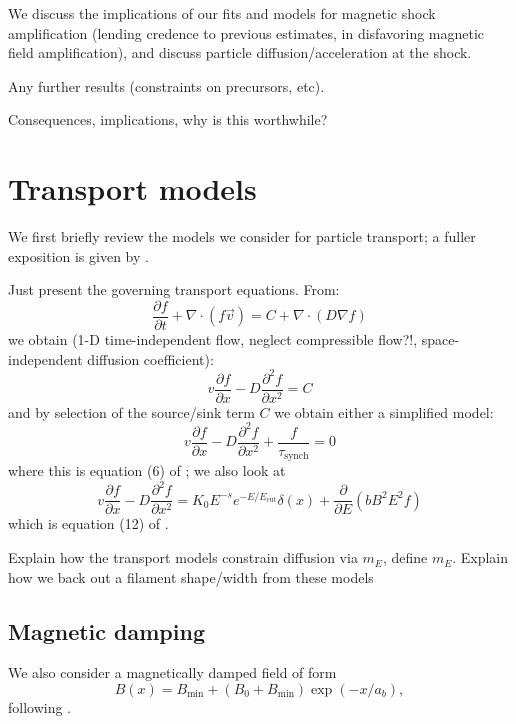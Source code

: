 \documentclass[iop, apj, numberedappendix, twocolappendix]{emulateapj}
\newcommand{\mt}{\mathrm}
\newcommand{\ptl}{\partial}
\newcommand{\del}{\nabla}
\begin{document}
We discuss the implications of our fits and models for magnetic shock
amplification (lending credence to previous estimates, in disfavoring magnetic
field amplification), and discuss particle diffusion/acceleration at the shock.

Any further results (constraints on precursors, etc).

Consequences, implications, why is this worthwhile?

\section{Transport models}

We first briefly review the models we consider for particle transport; a fuller
exposition is given by .

Just present the governing transport equations.  From:
\[
  \frac{\ptl f}{\ptl t} + \del \cdot \left( f \vec{v} \right)
  = C + \del \cdot \left( D \del f \right)
\]
we obtain (1-D time-independent flow, neglect compressible flow?!,
space-independent diffusion coefficient):
\[
    v \frac{\ptl f}{\ptl x} - D \frac{\ptl^2 f}{\ptl x^2} = C
\]
and by selection of the source/sink term $C$ we obtain either a
simplified model:
\begin{equation} \label{eq:simp-mod}
    v \frac{\ptl f}{\ptl x} - D \frac{\ptl^2 f}{\ptl x^2} +
    \frac{f}{\tau_{\mt{synch}}} = 0
\end{equation}
where this is equation (6) of ; we also look at
\begin{equation} \label{eq:full-mod}
    v \frac{\ptl f}{\ptl x} - D \frac{\ptl^2 f}{\ptl x^2} =
    K_0 E^{-s} e^{-E/E_{\mt{cut}}} \delta(x) + \frac{\ptl}{\ptl E}
      \left(bB^2E^2f\right)
\end{equation}
which is equation (12) of .

Explain how the transport models constrain diffusion via $m_E$, define $m_E$.
Explain how we back out a filament shape/width from these models

\subsection{Magnetic damping}

We also consider a magnetically damped field of form
\[
    B(x) = B_{\mt{min}} + \left(B_0 + B_{\mt{min}}\right) \exp\left(-x / a_b\right) ,
\]
following .
\end{document}
